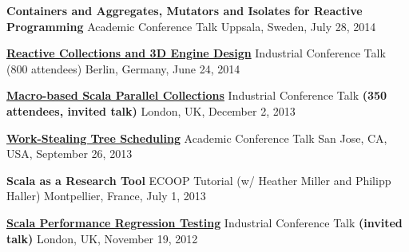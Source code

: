 \documentclass[9pt]{article}
\begin{document}
\begin{easylist}[itemize]
\noindent
{\bf Containers and Aggregates, Mutators and Isolates }
\vspace{-0.03in}
\newline
{\bf for Reactive Programming}
\dates{}
\newline\noindent Academic Conference Talk
\dates{}
\linebreak\noindent Uppsala, Sweden, July 28, 2014
\bigskip

\noindent\href{https://www.parleys.com/tutorial/53a7d2cde4b0543940d9e561/chapter1/about}
{\bf Reactive Collections and 3D Engine Design}
\vspace{-0.03in}
\newline\noindent Industrial Conference Talk (800 attendees)
\dates{}
\linebreak\noindent Berlin, Germany, June 24, 2014
\bigskip

\noindent
\href{http://skillsmatter.com/podcast/scala/macro-based-scala-parallel-collections}
{\bf Macro-based Scala Parallel Collections}
\vspace{-0.03in}
\newline\noindent Industrial Conference Talk \textbf{(350 attendees, invited talk)}
\dates{}
\linebreak\noindent London, UK, December 2, 2013
\bigskip

\noindent\href{http://axel22.github.io/resources/docs/lcpc13.pptx}
{\bf Work-Stealing Tree Scheduling}
\vspace{-0.03in}
\newline\noindent Academic Conference Talk
\dates{}
\linebreak\noindent San Jose, CA, USA, September 26, 2013
\bigskip

\noindent
{\bf Scala as a Research Tool}
\vspace{-0.03in}
\newline\noindent ECOOP Tutorial
                  (w/ Heather Miller and Philipp Haller)
\dates{}
\linebreak\noindent Montpellier, France, July 1, 2013
\bigskip

\noindent
\href{https://skillsmatter.com/skillscasts/3701-scala-performance-regression-testing}
{\bf Scala Performance Regression Testing}
\vspace{-0.03in}
\newline\noindent Industrial Conference Talk \textbf{(invited talk)}
\dates{}
\linebreak\noindent London, UK, November 19, 2012
\bigskip


\end{easylist}
\end{document}
